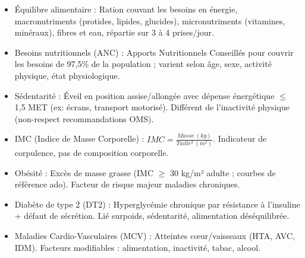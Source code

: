 \documentclass[11pt]{article}
\newcommand{\cle}[1]{{\popxbold\color{popdark}#1}}
\newcounter{popsec}
\newcounter{popsub}
\newcommand{\courssub}[1]{%
  \stepcounter{popsub}%
  \par\vspace{9pt}\noindent{\popxbold\fontsize{11.5}{13}\selectfont\color{popink}{\color{poporange}\thepopsec.\thepopsub}\hspace{6pt}#1}\par\nopagebreak\vspace{4pt}
}
\begin{document}
\begin{bilan}

\courssub{Définitions clés}
\begin{itemize}
  \item \cle{Équilibre alimentaire} : Ration couvant les besoins en énergie, macronutriments (protides, lipides, glucides), micronutriments (vitamines, minéraux), fibres et eau, répartie sur 3 à 4 prises/jour.
  \item \cle{Besoins nutritionnels (ANC)} : Apports Nutritionnels Conseillés pour couvrir les besoins de 97,5\% de la population ; varient selon âge, sexe, activité physique, état physiologique.
  \item \cle{Sédentarité} : Éveil en position assise/allongée avec dépense énergétique $\le$ 1,5 MET (ex: écrans, transport motorisé). Différent de l'inactivité physique (non-respect recommandations OMS).
  \item \cle{IMC (Indice de Masse Corporelle)} : $IMC = \frac{Masse\ (kg)}{Taille^2\ (m^2)}$. Indicateur de corpulence, pas de composition corporelle.
  \item \cle{Obésité} : Excès de masse grasse (IMC $\ge$ 30 kg/m² adulte ; courbes de référence ado). Facteur de risque majeur maladies chroniques.
  \item \cle{Diabète de type 2 (DT2)} : Hyperglycémie chronique par résistance à l'insuline + défaut de sécrétion. Lié surpoids, sédentarité, alimentation déséquilibrée.
  \item \cle{Maladies Cardio-Vasculaires (MCV)} : Atteintes cœur/vaisseaux (HTA, AVC, IDM). Facteurs modifiables : alimentation, inactivité, tabac, alcool.
\end{itemize}


\end{bilan}
\end{document}
